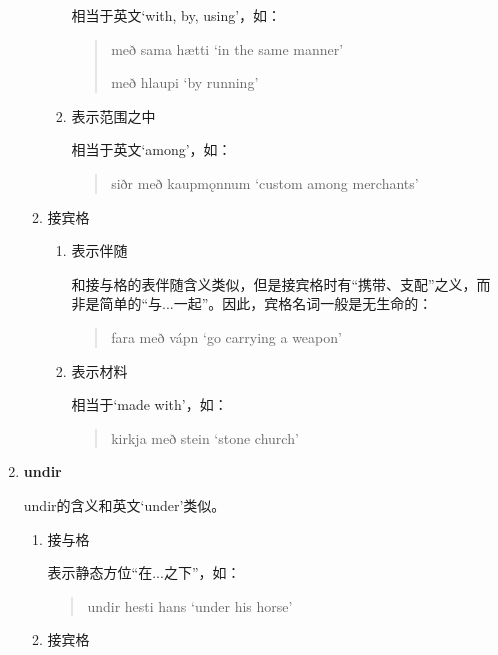 \begin{enumerate}[itemindent=1em, label=\textbf{\arabic*}.]
\begin{enumerate}
\begin{enumerate}
                              相当于英文`with, by, using'，如：
                              \begin{quote}
                                  með sama hætti `in the same manner'

                                  með hlaupi `by running'
                              \end{quote}

                        \item 表示范围之中

                              相当于英文`among'，如：
                              \begin{quote}
                                  siðr með kaupm\k{o}nnum `custom among merchants'
                              \end{quote}

                    \end{enumerate}
              \item 接宾格
                    \begin{enumerate}
                        \item 表示伴随

                              和接与格的表伴随含义类似，但是接宾格时有“携带、支配”之义，而非是简单的“与...一起”。因此，宾格名词一般是无生命的：
                              \begin{quote}
                                  fara með vápn `go carrying a weapon'
                              \end{quote}

                        \item 表示材料

                              相当于`made with'，如：
                              \begin{quote}
                                  kirkja með stein `stone church'
                              \end{quote}
                    \end{enumerate}
          \end{enumerate}

    \item \textbf{undir}

          undir的含义和英文`under'类似。
          \begin{enumerate}
              \item 接与格

                    表示静态方位“在...之下”，如：
                    \begin{quote}
                        undir hesti hans `under his horse'
                    \end{quote}
              \item 接宾格


\end{enumerate}
\end{enumerate}
